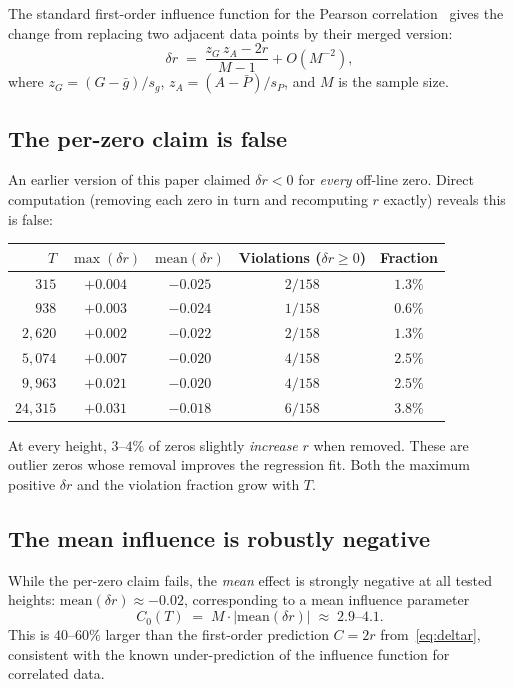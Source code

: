 \documentclass[11pt,a4paper]{article}
\begin{document}
The standard first-order influence function for the Pearson correlation~\cite{CookWeisberg1982} gives the change from replacing two adjacent data points by their merged version:
\begin{equation}\label{eq:deltar}
\delta r \;=\; \frac{z_G\,z_A - 2r}{M-1} + O(M^{-2}),
\end{equation}
where $z_G = (G-\bar{g})/s_g$, $z_A = (A-\bar{P})/s_P$, and $M$ is the sample size.

\subsection{The per-zero claim is false}

An earlier version of this paper claimed $\delta r < 0$ for \emph{every} off-line zero.
Direct computation (removing each zero in turn and recomputing $r$ exactly) reveals this is false:

\begin{center}
\begin{tabular}{rcccc}
\toprule
$T$ & $\max(\delta r)$ & $\mathrm{mean}(\delta r)$ & Violations ($\delta r \geq 0$) & Fraction \\
\midrule
$315$ & $+0.004$ & $-0.025$ & $2/158$ & $1.3\%$ \\
$938$ & $+0.003$ & $-0.024$ & $1/158$ & $0.6\%$ \\
$2{,}620$ & $+0.002$ & $-0.022$ & $2/158$ & $1.3\%$ \\
$5{,}074$ & $+0.007$ & $-0.020$ & $4/158$ & $2.5\%$ \\
$9{,}963$ & $+0.021$ & $-0.020$ & $4/158$ & $2.5\%$ \\
$24{,}315$ & $+0.031$ & $-0.018$ & $6/158$ & $3.8\%$ \\
\bottomrule
\end{tabular}
\end{center}

At every height, $3$--$4\%$ of zeros slightly \emph{increase} $r$ when removed.
These are outlier zeros whose removal improves the regression fit.
Both the maximum positive $\delta r$ and the violation fraction grow with $T$.

\subsection{The mean influence is robustly negative}

While the per-zero claim fails, the \emph{mean} effect is strongly negative at all tested heights:
$\mathrm{mean}(\delta r) \approx -0.02$, corresponding to a mean influence parameter
\[
C_0(T) \;=\; M \cdot |\mathrm{mean}(\delta r)| \;\approx\; 2.9 \text{--} 4.1.
\]
This is $40$--$60\%$ larger than the first-order prediction $C = 2r$ from~\eqref{eq:deltar}, consistent with the known under-prediction of the influence function for correlated data.
\end{document}
